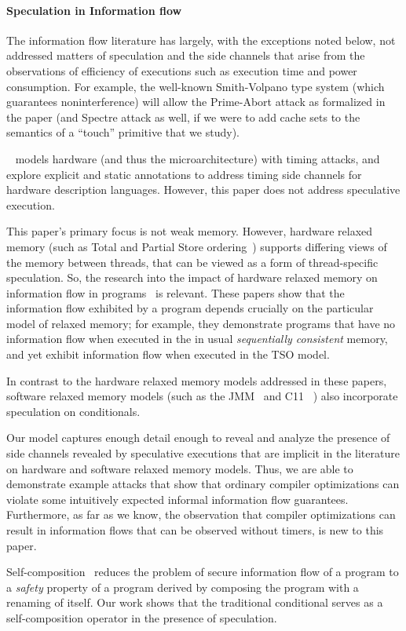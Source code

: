 \paragraph*{Speculation in Information flow}

The information flow literature has largely, with the exceptions noted below, not addressed matters of speculation and the side channels that arise from the observations  of efficiency of executions such as execution time and  power consumption.  For example, the well-known Smith-Volpano type system (which guarantees noninterference) will allow the Prime-Abort attack as formalized
in the paper (and Spectre attack as well, if we were to add cache sets to the semantics of a ``touch'' primitive that we study). 

~\citet{Zhang:2012:LCM:2345156.2254078}  models hardware (and thus the
microarchitecture) with timing attacks, and explore explicit and static annotations to address timing side channels for hardware description languages.  However, this paper does not address speculative execution. 

This paper's primary focus is not weak memory.  However, hardware relaxed memory (such as Total and Partial Store ordering~\cite{SparcV9}) supports differing views of the memory between threads, that can be viewed as a form of thread-specific speculation.  So, the research into the impact of hardware relaxed memory on information flow in programs~\cite{6957104,Vaughan:2012:SIF} is relevant.  These papers show that the information flow exhibited by a program  depends crucially on the particular model of relaxed memory; for example, they demonstrate programs that have no information flow when executed in the in usual {\em sequentially consistent} memory, and yet exhibit information flow when executed in the TSO model. 

In contrast to the hardware relaxed memory models addressed in these papers, software relaxed memory models (such as the JMM~\cite{Manson:2005:JMM:1047659.1040336} and C11~\cite{Boehm:2008:FCC:1375581.1375591} ) also incorporate speculation on conditionals.   

Our model captures enough detail  enough to reveal and analyze the presence of side
channels revealed by speculative executions that are implicit in the literature on hardware and software relaxed memory models. Thus, we are able to demonstrate example attacks that show that ordinary compiler optimizations can
violate some intuitively expected informal information flow guarantees.  Furthermore,  as far as we know, the observation that compiler optimizations can result in information flows that can be observed without timers, is new to this paper.  

Self-composition~\cite{Barthe:2004:SIF:1009380.1009669} reduces the problem of secure information flow of a program to a {\em safety} property of a program derived by composing the program with a renaming of itself.  Our work shows that the traditional conditional serves as a self-composition operator in the presence of speculation.  

